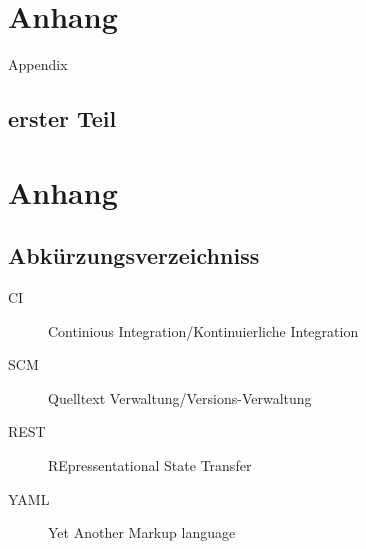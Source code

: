 \appendix
\chapter{Anhang}
Appendix
\section{erster Teil}
\chapter{Anhang}
\section{Abkürzungsverzeichniss}
\begin{description}
  \item[CI] Continious Integration/Kontinuierliche Integration
  \item[SCM] Quelltext Verwaltung/Versions-Verwaltung
  \item[REST] REpressentational State Transfer \cite{rest:definition}
  \item[YAML] Yet Another Markup language \cite{yaml:website}
\end{description}
